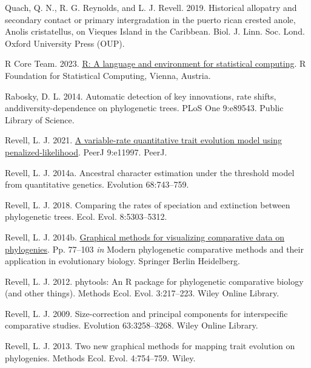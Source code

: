 \documentclass[fleqn,10pt,lineno]{wlpeerj} %
\newlength{\cslhangindent}
\newlength{\cslentryspacingunit} %
\newenvironment{CSLReferences}[2] %
 {%
  \setlength{\parindent}{0pt}
  \ifodd #1
  \let\oldpar\par
  \def\par{\hangindent=\cslhangindent\oldpar}
  \fi
  \setlength{\parskip}{#2\cslentryspacingunit}
 }%
 {}
\begin{document}
\begin{CSLReferences}{1}{0}
\leavevmode{}%
Quach, Q. N., R. G. Reynolds, and L. J. Revell. 2019. Historical allopatry and secondary contact or primary intergradation in the puerto rican crested anole, {Anolis cristatellus}, on {V}ieques {I}sland in the {C}aribbean. Biol. J. Linn. Soc. Lond. Oxford University Press (OUP).

\leavevmode{}%
R Core Team. 2023. \href{https://www.R-project.org/}{R: A language and environment for statistical computing}. R Foundation for Statistical Computing, Vienna, Austria.

\leavevmode{}%
Rabosky, D. L. 2014. Automatic detection of key innovations, rate shifts, and{d}iversity-{d}ependence on phylogenetic trees. PLoS One 9:e89543. Public Library of Science.

\leavevmode{}%
Revell, L. J. 2021. \href{https://doi.org/10.7717/peerj.11997}{A variable-rate quantitative trait evolution model using penalized-likelihood}. {PeerJ} 9:e11997. {PeerJ}.

\leavevmode{}%
Revell, L. J. 2014a. Ancestral character estimation under the threshold model from quantitative genetics. Evolution 68:743--759.

\leavevmode{}%
Revell, L. J. 2018. Comparing the rates of speciation and extinction between phylogenetic trees. Ecol. Evol. 8:5303--5312.

\leavevmode{}%
Revell, L. J. 2014b. \href{https://doi.org/10.1007/978-3-662-43550-2_4}{Graphical methods for visualizing comparative data on phylogenies}. Pp. 77--103 \emph{in} Modern phylogenetic comparative methods and their application in evolutionary biology. Springer Berlin Heidelberg.

\leavevmode{}%
Revell, L. J. 2012. {phytools}: An {R} package for phylogenetic comparative biology (and other things). Methods Ecol. Evol. 3:217--223. Wiley Online Library.

\leavevmode{}%
Revell, L. J. 2009. Size-correction and principal components for interspecific comparative studies. Evolution 63:3258--3268. Wiley Online Library.

\leavevmode{}%
Revell, L. J. 2013. Two new graphical methods for mapping trait evolution on phylogenies. Methods Ecol. Evol. 4:754--759. Wiley.


\end{CSLReferences}
\end{document}
